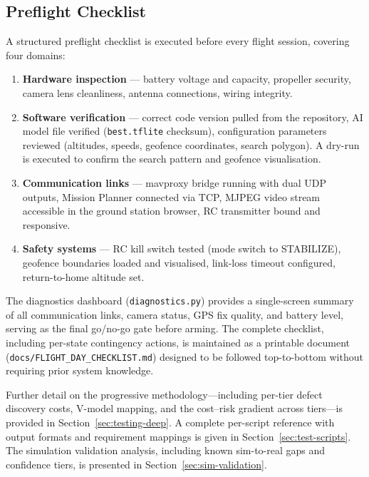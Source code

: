 \subsection{Preflight Checklist}\label{sec:test-preflight}

A structured preflight checklist is executed before every flight session, covering four domains:

\begin{enumerate}
    \item \textbf{Hardware inspection} --- battery voltage and capacity, propeller security, camera lens cleanliness, antenna connections, wiring integrity.
    \item \textbf{Software verification} --- correct code version pulled from the repository, AI model file verified (\texttt{best.tflite} checksum), configuration parameters reviewed (altitudes, speeds, geofence coordinates, search polygon). A dry-run is executed to confirm the search pattern and geofence visualisation.
    \item \textbf{Communication links} --- mavproxy bridge running with dual UDP outputs, Mission Planner connected via TCP, MJPEG video stream accessible in the ground station browser, RC transmitter bound and responsive.
    \item \textbf{Safety systems} --- RC kill switch tested (mode switch to STABILIZE), geofence boundaries loaded and visualised, link-loss timeout configured, return-to-home altitude set.
\end{enumerate}

The diagnostics dashboard (\texttt{diagnostics.py}) provides a single-screen summary of all communication links, camera status, GPS fix quality, and battery level, serving as the final go/no-go gate before arming. The complete checklist, including per-state contingency actions, is maintained as a printable document (\texttt{docs/FLIGHT\_DAY\_CHECKLIST.md}) designed to be followed top-to-bottom without requiring prior system knowledge.

\medskip
\noindent Further detail on the progressive methodology---including per-tier defect discovery costs, V-model mapping, and the cost--risk gradient across tiers---is provided in Section~\ref{sec:testing-deep}.  A complete per-script reference with output formats and requirement mappings is given in Section~\ref{sec:test-scripts}.  The simulation validation analysis, including known sim-to-real gaps and confidence tiers, is presented in Section~\ref{sec:sim-validation}.

